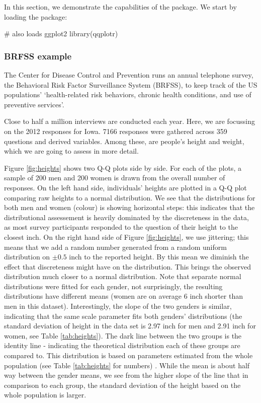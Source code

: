 \label{sec:examples}

In this section, we demonstrate the capabilities of the 
package. We start by loading the package:

\begin{Schunk}
\begin{Sinput}
# also loads ggplot2
library(qqplotr)
\end{Sinput}
\end{Schunk}

\subsubsection{BRFSS example}\label{brfss-example}

The Center for Disease Control and Prevention runs an annual telephone
survey, the Behavioral Risk Factor Surveillance System (BRFSS), to keep
track of the US populations' `health-related risk behaviors, chronic
health conditions, and use of preventive services'.

Close to half a million interviews are conducted each year. Here, we are
focussing on the 2012 responses for Iowa. 7166 responses were gathered
across 359 questions and derived variables. Among these, are people's
height and weight, which we are going to assess in more detail.

Figure \ref{fig:heights} shows two Q-Q plots side by side. For each of
the plots, a sample of 200 men and 200 women is drawn from the overall
number of responses. On the left hand side, individuals' heights are
plotted in a Q-Q plot comparing raw heights to a normal distribution. We
see that the distributions for both men and women (colour) is showing
horizontal steps: this indicates that the distributional assessement is
heavily dominated by the discreteness in the data, as most survey
participants responded to the question of their height to the closest
inch. On the right hand side of Figure \ref{fig:heights}, we use
jittering; this means that we add a random number generated from a
random uniform distribution on \(\pm 0.5\) inch to the reported height.
By this mean we diminish the effect that discreteness might have on the
distribution. This brings the observed distribution much closer to a
normal distribution. Note that separate normal distributions were fitted
for each gender, not surprisingly, the resulting distributions have
different means (women are on average 6 inch shorter than men in this
dataset). Interestingly, the slope of the two genders is similar,
indicating that the same scale parameter fits both genders'
distributions (the standard deviation of height in the data set is 2.97
inch for men and 2.91 inch for women, see Table \ref{tab:heights}). The
dark line between the two groups is the identity line - indicating the
theoretical distribution each of these groups are compared to. This
distribution is based on parameters estimated from the whole population
(see Table \ref{tab:heights} for numbers) . While the mean is about half
way between the gender means, we see from the higher slope of the line
that in comparison to each group, the standard deviation of the height
based on the whole population is larger.

